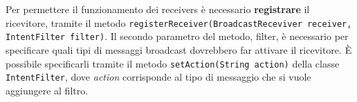                                 Per permettere il funzionamento dei receivers è necessario \textbf{registrare} il ricevitore, tramite il metodo
                                \texttt{registerReceiver(BroadcastReceviver receiver, IntentFilter filter)}.
                                Il secondo parametro del metodo, filter, è necessario per specificare quali tipi di messaggi broadcast dovrebbero far attivare il ricevitore. È possibile specificarli tramite il metodo \texttt{setAction(String action)} della classe \texttt{IntentFilter}, dove \textit{action} corrisponde al tipo di messaggio che si vuole aggiungere al filtro.              